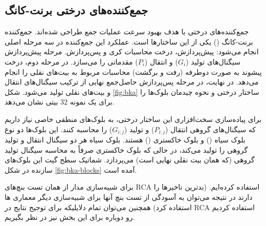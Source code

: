 \subsection{
    جمع‌کننده‌های درختی برنت-کانگ
    \protect{}
}
جمع‌کننده‌های درختی با هدف بهبود سرعت عملیات جمع طراحی شده‌اند. 
جمع‌کننده برنت-کانگ () یکی از این  ساختارها است. عملکرد این جمع‌کننده در سه 
مرحله اصلی انجام می‌شود: پیش‌پردازش، درخت محاسبات کری و پس‌پردازش. 
مرحله پیش‌پردازش سیگنال‌های تولید ($G_i$) و انتقال ($P_i$) مقدماتی را می‌سازد. 
در مرحله دوم، درخت پیشوند به صورت دوطرفه (رفت و برگشت) محاسبات مربوط به 
بیت‌های نقلی را انجام می‌دهد. در نهایت، در مرحله پس‌پردازش حاصل‌جمع نهایی 
از ترکیب سیگنال‌های انتقال و بیت‌های نقلی تولید می‌شود. شکل \ref{fig:bka} 
ساختار درختی و نحوه چیدمان بلوک‌ها را برای یک نمونه 32 بیتی نشان می‌دهد.



\newpage
{}
برای پیاده‌سازی سخت‌افزاری این ساختار درختی، به بلوک‌های منطقی 
خاصی نیاز داریم که سیگنال‌های گروهی انتقال ($P_{i:j}$) و تولید ($G_{i:j}$) 
را محاسبه کنند. این بلوک‌ها دو نوع بلوک سیاه () 
و بلوک خاکستری () هستند. بلوک سیاه هر دو سیگنال 
انتقال و تولید گروهی را تولید می‌کند، در حالی که بلوک خاکستری صرفاً به 
محاسبه سیگنال تولید گروهی (که همان بیت نقلی نهایی است) می‌پردازد. 
شماتیک سطح گیت این بلوک‌های سازنده در شکل \ref{fig:bka-blocks} آمده است.



\newpage


\newpage
برای شبیه‌سازی مدار از همان تست‌ بنچ‌های RCA استفاده کرده‌ایم. (بدترین تاخیر‌ها را دارند در نتیجه می‌توان به آسودگی از تست بنچ‌ آنها برای شبیه‌سازی دیگر معماری ها استفاده کرد)
همچنین می‌توان تمام دلایلیکه برای توجیح نتایج در RCA استفاده کردیم رو دوباره برای این بخش نیز در نظر بگیریم.

